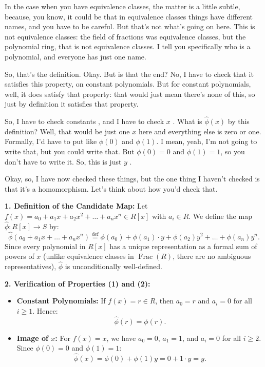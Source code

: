 \begin{proofWrapper}
\begin{speech}[00:10:45 - 00:12:20]
In the case when you have equivalence classes, the matter is a little subtle, because, you know, it could be that in equivalence classes things have different names, and you have to be careful. But that's not what's going on here. This is not equivalence classes: the field of fractions was equivalence classes, but the polynomial ring, that is not equivalence classes. I tell you specifically who is a polynomial, and everyone has just one name.

So, that's the definition. Okay. But is that the end? No, I have to check that it satisfies this property, on constant polynomials. But for constant polynomials, well, it does satisfy that property: that would just mean there's none of this, so just by definition it satisfies that property.

So, I have to check constants , and I have to check $x$ . What is $\hat{\phi}(x)$ by this definition? Well, that would be just one $x$ here and everything else is zero or one. Formally, I'd have to put like $\phi(0)$ and $\phi(1)$. I mean, yeah, I'm not going to write that, but you could write that. But $\phi(0) = 0$ and $\phi(1) = 1$, so you don't have to write it. So, this is just $y$ .

Okay, so, I have now checked these things, but the one thing I haven't checked is that it's a homomorphism. Let's think about how you'd check that.
\end{speech}

\begin{content}
\textbf{1. Definition of the Candidate Map:}
Let $f(x) = a_0 + a_1 x + a_2 x^2 + \dots + a_n x^n \in R[x]$ with $a_i \in R$. We define the map $\hat{\phi} \colon R[x] \to S$ by:
\begin{equation}\label{eq:phi-hat-def}
\hat{\phi}(a_0 + a_1 x + \dots + a_n x^n) \stackrel{\text{def}}{=} \phi(a_0) + \phi(a_1) \cdot y + \phi(a_2) y^2 + \dots + \phi(a_n) y^n.
\end{equation}
Since every polynomial in $R[x]$ has a unique representation as a formal sum of powers of $x$ (unlike equivalence classes in $\operatorname{Frac}(R)$, there are no ambiguous representatives), $\hat{\phi}$ is unconditionally well-defined.

\textbf{2. Verification of Properties \textbf{(1)} and \textbf{(2)}:}
\begin{itemize}
    \item \textbf{Constant Polynomials:} If $f(x) = r \in R$, then $a_0 = r$ and $a_i = 0$ for all $i \ge 1$. Hence:
    \[
    \hat{\phi}(r) = \phi(r).
    \]
    \item \textbf{Image of $x$:} For $f(x) = x$, we have $a_0 = 0$, $a_1 = 1$, and $a_i = 0$ for all $i \ge 2$. Since $\phi(0) = 0$ and $\phi(1) = 1$:
    \[
    \hat{\phi}(x) = \phi(0) + \phi(1) y = 0 + 1 \cdot y = y.
    \]
\end{itemize}
\end{content}


\end{proofWrapper}
